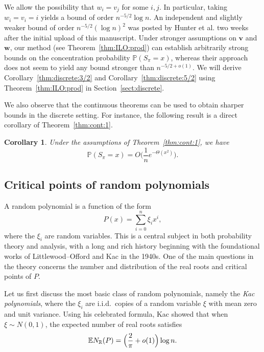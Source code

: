 \documentclass[reqno]{amsart}
\newcommand\R{{\mathbb{R}}}
\renewcommand\P{{\mathbb{P}}}
\newcommand\E{{\mathbb{E}}}
\newcommand\BMv{{\bm v}}
\newcommand\BMw{{\bm w}}
\theoremstyle{plain}
\newtheorem{corollary}[theorem]{Corollary}
\theoremstyle{definition}
\begin{document}
We allow the possibility that $w_i=v_j$ for some $i,j$.
In particular, taking $w_i=v_i=i$ yields a bound of order $n^{-5/2}\log n$. An independent and slightly weaker bound of order $n^{-5/2}(\log n)^2 $ was posted by Hunter et al. \cite{HPZ} two weeks after the initial upload of this manuscript. Under stronger assumptions on $\BMv$ and $\BMw$, our method (see Theorem~\ref{thm:ILO:prod}) can establish
arbitrarily strong bounds on the concentration probability $\P(S_{\pi}=x)$, whereas their approach does not seem to yield any bound stronger than $n^{-5/2+o(1)}$. 
We will derive 
Corollary~\ref{thm:discrete:3/2} and Corollary~\ref{thm:discrete:5/2} using Theorem~\ref{thm:ILO:prod} in
Section~\ref{sect:discrete}. 


\medskip

We also observe that the continuous theorems can be used to obtain sharper
bounds in the discrete setting. For instance, the following result is a direct
corollary of Theorem~\ref{thm:cont:1}.

\begin{corollary}
Under the assumptions of Theorem~\ref{thm:cont:1}, we have
\begin{equation}%
\P(S_{\pi}=x)
= O\Big(\frac{1}{n} e^{-\Theta(x^2)}\Big).
\end{equation}
\end{corollary}


\subsection{Critical points of random polynomials}

A random polynomial is a function of the form
\[
P(x)=\sum_{i=0}^n \xi_i x^i,
\]
where the $\xi_i$ are random variables. This is a central subject in both
probability theory and analysis, with a long and rich history beginning with
the foundational works of Littlewood--Offord and Kac in the 1940s. One of the
main questions in the theory concerns the number and distribution of the real
roots and critical points of $P$.

Let us first discuss the most basic class of random polynomials, namely the
\emph{Kac polynomials}, where the $\xi_i$ are i.i.d.\ copies of a random
variable $\xi$ with mean zero and unit variance. Using his celebrated formula,
Kac showed that when $\xi\sim N(0,1)$, the expected number of real roots
satisfies
\begin{equation}\label{expectation}
\E N_{\R}(P)=\Bigl(\frac{2}{\pi}+o(1)\Bigr)\log n .
\end{equation}
\end{document}
